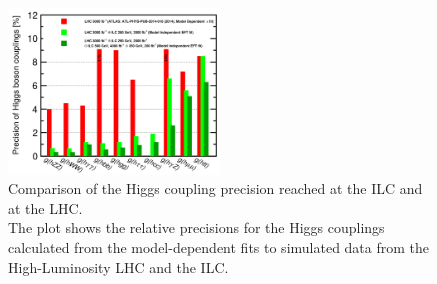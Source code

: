 \begin{figure}
\centering
\includegraphics[width=0.5\textwidth]{Figures/Higgs_couplings.png}
\caption[Higgs coupling precisions]{Comparison of the Higgs coupling precision reached at the ILC and at the LHC.\cite[p. 9]{ILCPhysics}\\
The plot shows the relative precisions for the Higgs couplings calculated from the model-dependent fits to simulated data from the High-Luminosity LHC and the ILC.}
\label{fig:Higgs_couplings}
\end{figure}
